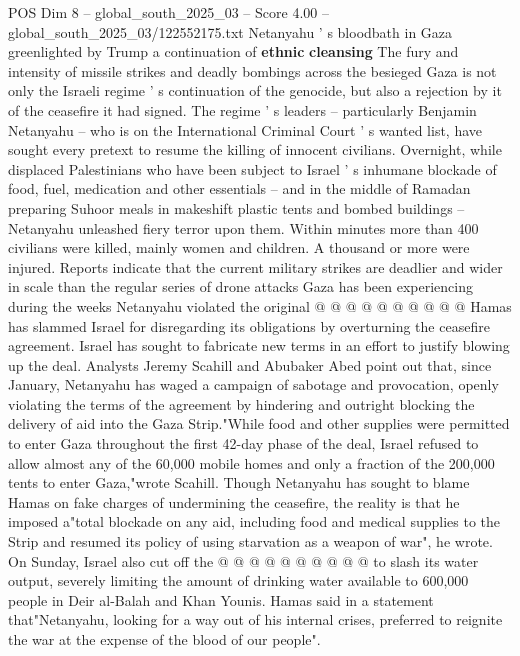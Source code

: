 \begin{textsample}{POS Dim 8 – global\_south\_2025\_03 – Score 4.00 – global\_south\_2025\_03/122552175.txt}  \label{ex:f8_pos_148}
Netanyahu ' s bloodbath in Gaza greenlighted by Trump a continuation of \textbf{ethnic} \textbf{cleansing} The fury and intensity of missile strikes and deadly bombings across the besieged Gaza is not only the Israeli regime ' s continuation of the genocide, but also a rejection by it of the ceasefire it had signed.
The regime ' s leaders -- particularly Benjamin Netanyahu -- who is on the International Criminal Court ' s wanted list, have sought every pretext to resume the killing of innocent civilians.
Overnight, while displaced Palestinians who have been subject to Israel ' s inhumane blockade of food, fuel, medication and other essentials -- and in the middle of Ramadan preparing Suhoor meals in makeshift plastic tents and bombed buildings -- Netanyahu unleashed fiery terror upon them.
Within minutes more than 400 civilians were killed, mainly women and children.
A thousand or more were injured.
Reports indicate that the current military strikes are deadlier and wider in scale than the regular series of drone attacks Gaza has been experiencing during the weeks Netanyahu violated the original @ @ @ @ @ @ @ @ @ @ Hamas has slammed Israel for disregarding its obligations by overturning the ceasefire agreement.
Israel has sought to fabricate new terms in an effort to justify blowing up the deal.
Analysts Jeremy Scahill and Abubaker Abed point out that, since January, Netanyahu has waged a campaign of sabotage and provocation, openly violating the terms of the agreement by hindering and outright blocking the delivery of aid into the Gaza Strip."While food and other supplies were permitted to enter Gaza throughout the first 42-day phase of the deal, Israel refused to allow almost any of the 60,000 mobile homes and only a fraction of the 200,000 tents to enter Gaza,"wrote Scahill.
Though Netanyahu has sought to blame Hamas on fake charges of undermining the ceasefire, the reality is that he imposed a"total blockade on any aid, including food and medical supplies to the Strip and resumed its policy of using starvation as a weapon of war", he wrote.
On Sunday, Israel also cut off the @ @ @ @ @ @ @ @ @ @ to slash its water output, severely limiting the amount of drinking water available to 600,000 people in Deir al-Balah and Khan Younis.
Hamas said in a statement that"Netanyahu, looking for a way out of his internal crises, preferred to reignite the war at the expense of the blood of our people".

\end{textsample}
